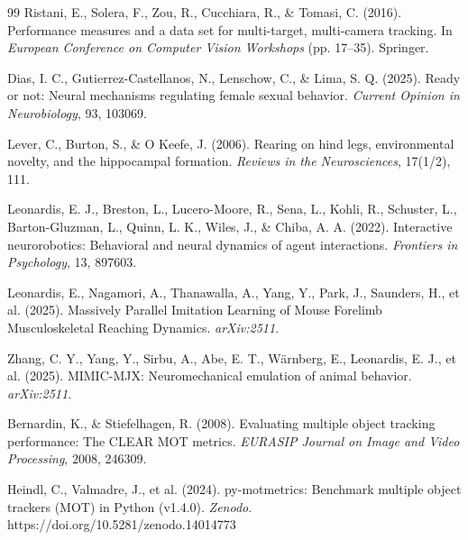 \documentclass[pdflatex, sn-nature]{sn-jnl}
\theoremstyle{thmstyleone}%
\theoremstyle{thmstyletwo}%
\theoremstyle{thmstylethree}%
\begin{document}
\begin{thebibliography}{99}
 Ristani, E., Solera, F., Zou, R., Cucchiara, R., \& Tomasi, C. (2016). Performance measures and a data set for multi-target, multi-camera tracking. In \textit{European Conference on Computer Vision Workshops} (pp. 17--35). Springer.

 Dias, I. C., Gutierrez-Castellanos, N., Lenschow, C., \& Lima, S. Q. (2025). Ready or not: Neural mechanisms regulating female sexual behavior. \textit{Current Opinion in Neurobiology}, 93, 103069.

 Lever, C., Burton, S., \& O Keefe, J. (2006).  Rearing on hind legs, environmental novelty, and the hippocampal formation. \textit{Reviews in the Neurosciences}, 17(1/2), 111.

 Leonardis, E. J., Breston, L., Lucero-Moore, R., Sena, L., Kohli, R., Schuster, L., Barton-Gluzman, L., Quinn,  L. K., Wiles, J., \& Chiba, A. A. (2022). Interactive neurorobotics: Behavioral and neural dynamics of agent interactions. \textit{Frontiers in Psychology}, 13, 897603.

 Leonardis, E., Nagamori, A., Thanawalla, A., Yang, Y., Park, J., Saunders, H., et al. (2025). Massively Parallel Imitation Learning of Mouse Forelimb Musculoskeletal Reaching Dynamics. \textit{arXiv:2511}.

 Zhang, C. Y., Yang, Y., Sirbu, A., Abe, E. T., Wärnberg, E., Leonardis, E. J., et al. (2025). MIMIC-MJX: Neuromechanical emulation of animal behavior. \textit{arXiv:2511}.

 Bernardin, K., \& Stiefelhagen, R. (2008). Evaluating multiple object tracking performance: The CLEAR MOT metrics. \textit{EURASIP Journal on Image and Video Processing}, 2008, 246309.

 Heindl, C., Valmadre, J., et al. (2024). py-motmetrics: Benchmark multiple object trackers (MOT) in Python (v1.4.0). \textit{Zenodo}. https://doi.org/10.5281/zenodo.14014773

\end{thebibliography}
\end{document}
